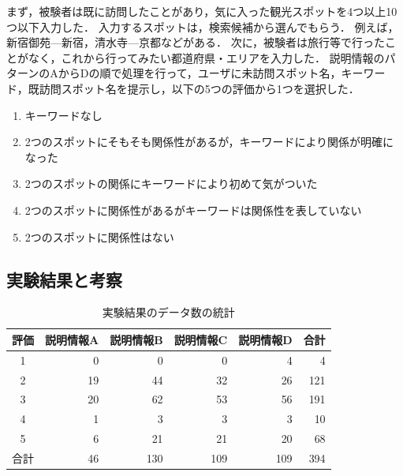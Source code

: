 \documentclass{deimj}
\begin{document}
まず，被験者は既に訪問したことがあり，気に入った観光スポットを4つ以上10つ以下入力した．
入力するスポットは，検索候補から選んでもらう．
例えば，新宿御苑---新宿，清水寺---京都などがある．
次に，被験者は旅行等で行ったことがなく，これから行ってみたい都道府県・エリアを入力した．
説明情報のパターンのAからDの順で処理を行って，ユーザに未訪問スポット名，キーワード，既訪問スポット名を提示し，以下の5つの評価から1つを選択した．
\begin{enumerate}
  \item キーワードなし
  \item 2つのスポットにそもそも関係性があるが，キーワードにより関係が明確になった
  \item 2つのスポットの関係にキーワードにより初めて気がついた
  \item 2つのスポットに関係性があるがキーワードは関係性を表していない
  \item 2つのスポットに関係性はない
\end{enumerate}


\subsection{実験結果と考察}
\label{subsec:実験結果}

\begin{table}[t]
  \caption{実験結果のデータ数の統計}
  \label{table:実験結果のデータ数の統計}
  \centering
  \begin{tabular}{c|r|r|r|r|r}
  \hline
  評価 & \multicolumn{1}{c|}{説明情報A} & \multicolumn{1}{c|}{説明情報B} & \multicolumn{1}{c|}{説明情報C} & \multicolumn{1}{c|}{説明情報D} & \multicolumn{1}{c}{合計} \\ \hline
  1  & 0                      & 0                      & 0                      & 4                      & 4                      \\ \hline
  2  & 19                     & 44                     & 32                     & 26                     & 121                    \\ \hline
  3  & 20                     & 62                     & 53                     & 56                     & 191                    \\ \hline
  4  & 1                      & 3                      & 3                      & 3                      & 10                     \\ \hline
  5  & 6                      & 21                     & 21                     & 20                     & 68                     \\ \hline
  合計 & 46                     & 130                    & 109                    & 109                    & 394                    \\ \hline
  \end{tabular}
\end{table}
\end{document}

